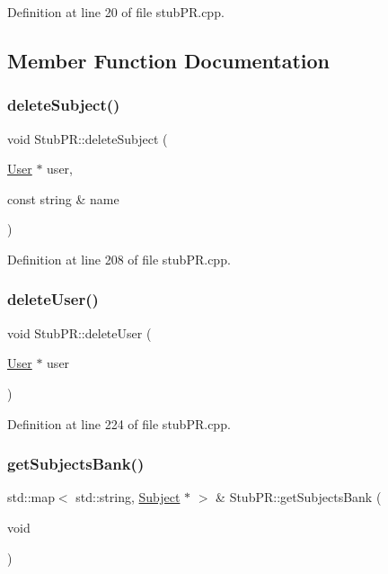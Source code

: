 Definition at line 20 of file stub\+P\+R.\+cpp.



\subsection{Member Function Documentation}
\mbox{\label{class_stub_p_r_aa15daf429eb5f67810998dd9fc9549af}} 
\subsubsection{\texorpdfstring{delete\+Subject()}{deleteSubject()}}
{\footnotesize\ttfamily void Stub\+P\+R\+::delete\+Subject (\begin{DoxyParamCaption}\item[{\hyperlink{class_user}{User} $\ast$}]{user,  }\item[{const string \&}]{name }\end{DoxyParamCaption})}



Definition at line 208 of file stub\+P\+R.\+cpp.

\mbox{\label{class_stub_p_r_a233d8c7bb7d5b433c8581e4d85d01884}} 
\subsubsection{\texorpdfstring{delete\+User()}{deleteUser()}}
{\footnotesize\ttfamily void Stub\+P\+R\+::delete\+User (\begin{DoxyParamCaption}\item[{\hyperlink{class_user}{User} $\ast$}]{user }\end{DoxyParamCaption})}



Definition at line 224 of file stub\+P\+R.\+cpp.

\mbox{\label{class_stub_p_r_a16c53dfcc357d1aed6070b53a55590e2}} 
\subsubsection{\texorpdfstring{get\+Subjects\+Bank()}{getSubjectsBank()}}
{\footnotesize\ttfamily std\+::map$<$ std\+::string, \hyperlink{class_subject}{Subject} $\ast$ $>$ \& Stub\+P\+R\+::get\+Subjects\+Bank (\begin{DoxyParamCaption}\item[{void}]{ }\end{DoxyParamCaption})}



